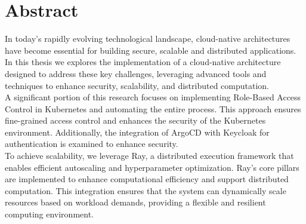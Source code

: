 \chapter*{Abstract}
\thispagestyle{empty}

In today’s rapidly evolving technological landscape, cloud-native architectures have become essential for building secure, scalable and distributed applications. In this thesis we explores the implementation of a cloud-native architecture designed to address these key challenges, leveraging advanced tools and techniques to enhance security, scalability, and distributed computation.\cite{1}\\
A significant portion of this research focuses on implementing Role-Based Access Control  in Kubernetes and automating the entire process. This approach ensures fine-grained access control and enhances the security of the Kubernetes environment\cite{2}. Additionally, the integration of ArgoCD with Keycloak for authentication is examined to enhance security.\\
To achieve scalability, we leverage Ray, a distributed execution framework that enables efficient autoscaling and hyperparameter optimization. Ray's core pillars are implemented to enhance computational efficiency and support distributed computation. This integration ensures that the system can dynamically scale resources based on workload demands, providing a flexible and resilient computing environment.


\thispagestyle{empty}
\mbox{ }
\newpage